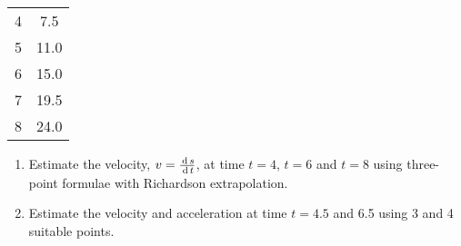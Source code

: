 \documentclass[12pt,class=book,crop=false]{standalone}
\begin{document}
\begin{enumerate}
\begin{table}[H]
\begin{tabular}{cS[table-format=3.2]}
                   4   &7.5 \\
                    5    &11.0 \\
                     6    &15.0 \\
                      7    &19.5 \\
                       8    &24.0 \\\bottomrule
              \end{tabular}
          \end{table}
          \begin{enumerate}
              \item Estimate the velocity, $ v=\frac{\,\mathrm{d}\, s}{\,\mathrm{d}\, t} $, at time $ t=4 $, $ t=6 $ and $ t=8 $ using three-point formulae with Richardson extrapolation.
              \item Estimate the velocity and acceleration at time $ t = 4.5 $ and 6.5 using 3 and 4 suitable points.
          \end{enumerate}
\end{enumerate}
\end{document}
